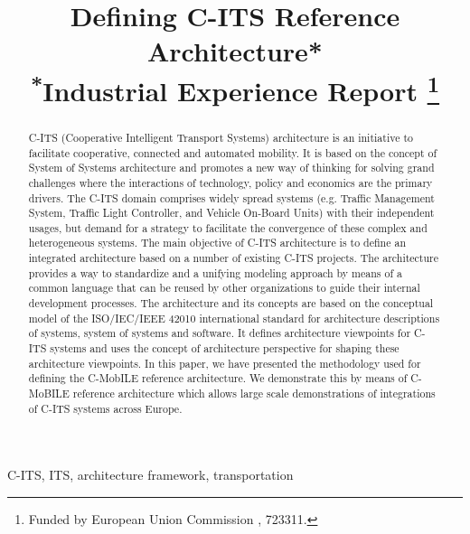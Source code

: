 \documentclass[conference]{IEEEtran}
\begin{document}
\title{Defining C-ITS Reference Architecture* \\
{\footnotesize \textsuperscript{*}Industrial Experience Report}
\thanks{Funded by European Union Commission , 723311.}
}


\author{
	}
\maketitle


\begin{abstract}
C-ITS (Cooperative Intelligent Transport Systems) architecture  is an initiative to facilitate cooperative, connected and automated mobility. It is based on the concept of System of Systems architecture and promotes a new way of thinking for solving grand challenges where the interactions of technology, policy and economics are the primary drivers. The C-ITS domain comprises widely spread systems (e.g. Traffic Management System, Traffic Light Controller, and Vehicle On-Board Units) with their independent usages, but demand for a strategy to facilitate the convergence of these complex and heterogeneous systems. The main objective of C-ITS architecture is to define an integrated architecture based on a number of existing C-ITS projects. The architecture provides a way to standardize and a unifying modeling approach by means of a common language that can be reused by other organizations to guide their internal development processes. The architecture and its concepts are based on the conceptual model of the ISO/IEC/IEEE 42010 international standard for architecture descriptions of systems, system of systems and software. It defines architecture viewpoints for C-ITS systems and uses the concept of architecture perspective for shaping these architecture viewpoints. In this paper, we have presented the methodology used for defining the C-MobILE reference architecture. We demonstrate this by means of C-MoBILE reference architecture which allows large scale demonstrations of integrations of C-ITS systems across Europe.
\end{abstract}
\begin{IEEEkeywords}
	C-ITS, ITS, architecture framework, transportation
\end{IEEEkeywords}
\end{document}
